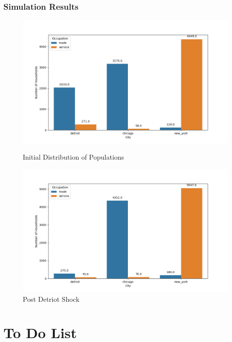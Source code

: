 \documentclass[serif, 9pt, aspectratio=32]{beamer}
\begin{document}
\begin{frame}
    \centering
    \frametitle{Simulation Results}
    \begin{figure}[h]
        \begin{minipage}{0.5\textwidth}
            \centering
            \includegraphics[width=\textwidth]{../../simulations/graphs/city_pop.png}
            \caption{Initial Distribution of Populations}
            \label{city_pop}
        \end{minipage}%
        \begin{minipage}{0.5\textwidth}
            \centering
            \includegraphics[width=\textwidth]{../../simulations/graphs/c_shock.png}
            \caption{Post Detriot Shock}
            \label{c_shock}
        \end{minipage}
    \end{figure}
\end{frame}

\section{To Do List}
\end{document}
